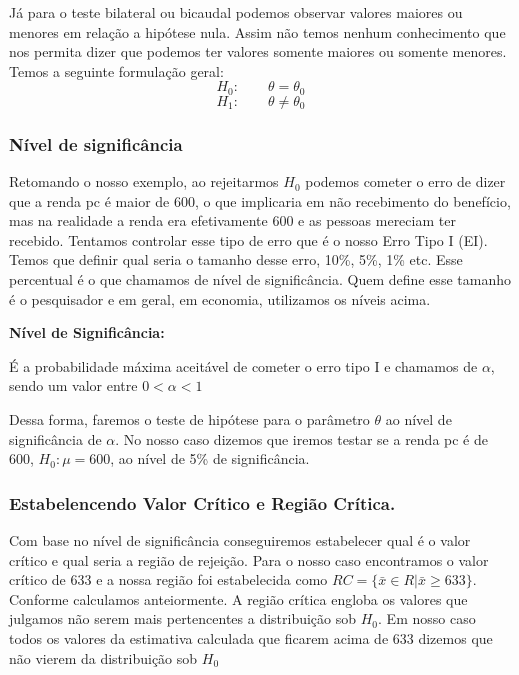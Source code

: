 \documentclass[
  letterpaper,
  DIV=11,
  numbers=noendperiod]{scrartcl}
\begin{document}
Já para o teste bilateral ou bicaudal podemos observar valores maiores
ou menores em relação a hipótese nula. Assim não temos nenhum
conhecimento que nos permita dizer que podemos ter valores somente
maiores ou somente menores. Temos a seguinte formulação geral:
\[H_0: \qquad \theta=\theta_0\] \[H_1: \qquad \theta \neq \theta_0\]

\subsubsection{Nível de
significância}\label{nuxedvel-de-significuxe2ncia}

Retomando o nosso exemplo, ao rejeitarmos \(H_0\) podemos cometer o erro
de dizer que a renda pc é maior de 600, o que implicaria em não
recebimento do benefício, mas na realidade a renda era efetivamente 600
e as pessoas mereciam ter recebido. Tentamos controlar esse tipo de erro
que é o nosso Erro Tipo I (EI). Temos que definir qual seria o tamanho
desse erro, 10\%, 5\%, 1\% etc. Esse percentual é o que chamamos de
nível de significância. Quem define esse tamanho é o pesquisador e em
geral, em economia, utilizamos os níveis acima.

\begin{definicao}

\textbf{Nível de Significância:}

É a probabilidade máxima aceitável de cometer o erro tipo I e chamamos
de \(\alpha\), sendo um valor entre \(0<\alpha<1\)

\end{definicao}

Dessa forma, faremos o teste de hipótese para o parâmetro \(\theta\) ao
nível de significância de \(\alpha\). No nosso caso dizemos que iremos
testar se a renda pc é de 600, \(H_0: \mu=600\), ao nível de 5\% de
significância.

\subsubsection{Estabelencendo Valor Crítico e Região
Crítica.}\label{estabelencendo-valor-cruxedtico-e-regiuxe3o-cruxedtica.}

Com base no nível de significância conseguiremos estabelecer qual é o
valor crítico e qual seria a região de rejeição. Para o nosso caso
encontramos o valor crítico de 633 e a nossa região foi estabelecida
como \(RC =\{\bar{x} \in R | \bar{x} \geq 633\}\). Conforme calculamos
anteiormente. A região crítica engloba os valores que julgamos não serem
mais pertencentes a distribuição sob \(H_0\). Em nosso caso todos os
valores da estimativa calculada que ficarem acima de 633 dizemos que não
vierem da distribuição sob \(H_0\)
\end{document}
